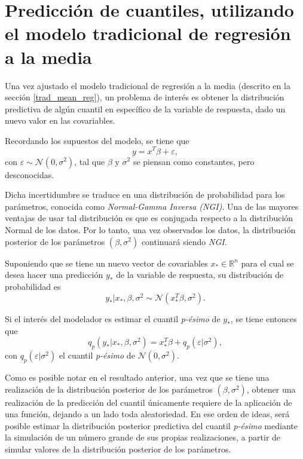 \chapter{Predicci\'on de cuantiles, utilizando el modelo tradicional de regresi\'on a la media} \label{trad_mean_alg}

Una vez ajustado el modelo tradicional de regresi\'on a la media (descrito en la secci\'on \ref{trad_mean_reg}), un problema de inter\'es es obtener la distribuci\'on predictiva de alg\'un cuantil en espec\'ifico de la variable de respuesta, dado un nuevo valor en las covariables.

Recordando los supuestos del modelo, se tiene que
\begin{equation*}
    y = x^T\beta + \varepsilon,
\end{equation*}
con $\varepsilon \sim \mathcal{N}(0,\sigma^2)$, tal que $\beta$ y $\sigma^2$ se piensan como constantes, pero desconocidas. 

Dicha incertidumbre se traduce en una distribuci\'on de probabilidad para los par\'ametros, conocida como \textit{Normal-Gamma Inversa (NGI)}. Una de las mayores ventajas de usar tal distribuci\'on es que es conjugada respecto a la distribuci\'on Normal de los datos. Por lo tanto, una vez observados los datos, la distribuci\'on posterior de los par\'ametros $(\beta, \sigma^2)$ continuar\'a siendo \textit{NGI}.

Suponiendo que se tiene un nuevo vector de covariables $x_* \in \mathbb{R}^n$ para el cual se desea hacer una predicci\'on $y_*$ de la variable de respuesta, su distribuci\'on de probabilidad es
\begin{equation*}
    y_* | x_*, \beta, \sigma^2 \sim \mathcal{N}(x_*^T\beta, \sigma^2).
\end{equation*}

Si el inter\'es del modelador es estimar el cuantil \textit{p-\'esimo} de $y_*$, se tiene entonces que
\begin{equation*}
    q_p(y_*|x_*, \beta, \sigma^2) = x_*^T\beta + q_p(\varepsilon|\sigma^2),
\end{equation*}
con $q_p(\varepsilon|\sigma^2)$ el cuantil \textit{p-\'esimo} de $\mathcal{N}(0,\sigma^2)$.

Como es posible notar en el resultado anterior, una vez que se tiene una realizaci\'on de la distribuci\'on posterior de los par\'ametros $(\beta, \sigma^2)$, obtener una realizaci\'on de la predicci\'on del cuantil \'unicamente requiere de la aplicaci\'on de una funci\'on, dejando a un lado toda aleatoriedad. En ese orden de ideas, ser\'a posible estimar la distribuci\'on posterior predictiva del cuantil \textit{p-\'esimo} mediante la simulaci\'on de un n\'umero grande de sus propias realizaciones, a partir de simular valores de la distribuci\'on posterior de los par\'ametros. 

